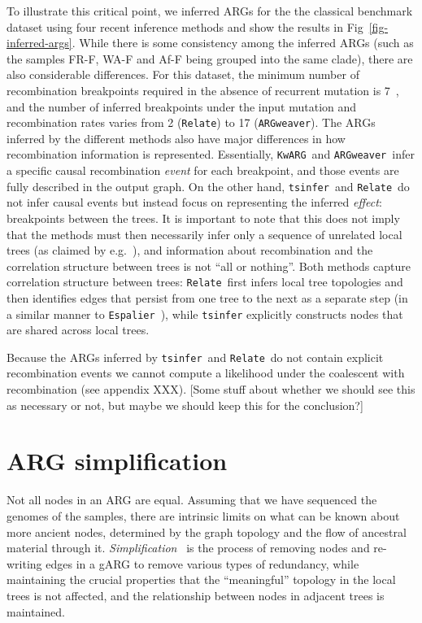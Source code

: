\documentclass{article}
\newcommand{\tsinfer}[0]{\texttt{tsinfer}}
\newcommand{\kwarg}[0]{\texttt{KwARG}}
\newcommand{\argweaver}[0]{\texttt{ARGweaver}}
\newcommand{\relate}[0]{\texttt{Relate}}
\newcommand{\espalier}[0]{\texttt{Espalier}}
\begin{document}
To illustrate this critical point, we inferred ARGs for the
the classical \citet{kreitman1983nucleotide} benchmark dataset
using four recent inference methods and show the results in
Fig~\ref{fig-inferred-args}.
While there is some consistency among the inferred ARGs (such as the samples
FR-F, WA-F and Af-F being grouped into the same clade), there
are also considerable differences. For this dataset, the minimum number
of recombination breakpoints required in the absence of recurrent mutation
is 7~\citep{song2003parsimonious}, and the number of inferred breakpoints
under the input mutation and recombination rates
varies from 2 (\relate) to 17 (\argweaver).
The ARGs inferred by the different methods also have major differences
in how recombination information is represented. Essentially,
\kwarg\ and \argweaver\ infer a specific causal recombination \emph{event}
for each breakpoint, and those events are fully
described in the output graph. On the other hand, \tsinfer\ and
\relate\ do not infer causal events but instead focus on
representing the inferred \emph{effect}: breakpoints between the
trees. It is important to note that this does not imply that
the methods must then necessarily infer only a sequence of
unrelated local trees
(as claimed by e.g.~\citep{hejase2020summary}),
and information about recombination and the correlation structure
between trees is not ``all or nothing''.
Both methods capture correlation structure between trees:
\relate\ first infers local tree topologies and then identifies edges
that persist from one tree to the next as a separate step
(in a similar manner to \espalier~\citep{rasmussen2022espalier}), while
\texttt{tsinfer} explicitly constructs nodes that are shared across local
trees.

Because the ARGs inferred by \tsinfer\ and \relate\ do not contain
explicit recombination events we cannot compute a likelihood
under the coalescent with recombination (see appendix XXX).
[Some stuff about whether we should see this as necessary or not,
but maybe we should keep this for the conclusion?]

\section*{ARG simplification}\label{ARG_simplification}

Not all nodes in an ARG are equal. Assuming that we have sequenced the
genomes of the samples, there are intrinsic limits on what can
be known about more ancient nodes, determined by the graph topology
and the flow of ancestral material through it.
\emph{Simplification}~\citep{kelleher2018efficient} is the process
of removing nodes and re-writing edges in a gARG to remove
various types of redundancy, while maintaining the crucial properties
that the ``meaningful'' topology in the local trees is not affected,
and the relationship between nodes in adjacent trees is maintained.
\end{document}
